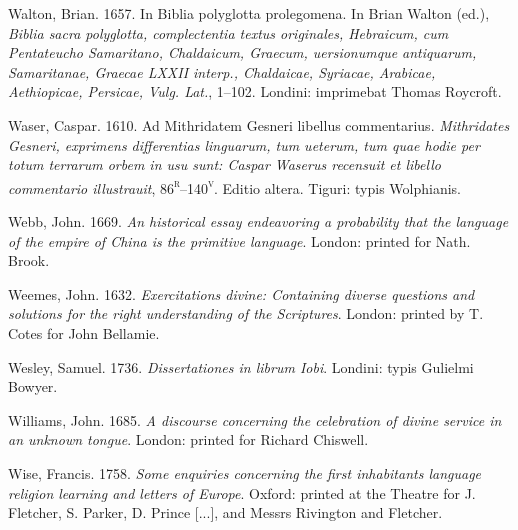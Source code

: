 \begin{styleStandard}
Walton, Brian. 1657. In Biblia polyglotta prolegomena. In Brian Walton (ed.), \textit{Biblia sacra polyglotta, complectentia textus originales, Hebraicum, cum Pentateucho Samaritano, Chaldaicum, Graecum, uersionumque antiquarum, Samaritanae, Graecae LXXII interp., Chaldaicae, Syriacae, Arabicae, Aethiopicae, Persicae, Vulg. Lat.}, 1–102. Londini: imprimebat Thomas Roycroft.
\end{styleStandard}

\begin{styleStandard}
Waser, Caspar. 1610. Ad Mithridatem Gesneri libellus commentarius. \textit{Mithridates Gesneri, exprimens differentias linguarum, tum ueterum, tum quae hodie per totum terrarum orbem in usu sunt: Caspar Waserus recensuit et libello commentario illustrauit}, 86\textsc{\textsuperscript{r}}–140\textsc{\textsuperscript{v}}. Editio altera. Tiguri: typis Wolphianis.
\end{styleStandard}

\begin{styleStandard}
Webb, John. 1669. \textit{An historical essay endeavoring a probability that the language of the empire of China is the primitive language}. London: printed for Nath. Brook.
\end{styleStandard}

\begin{styleStandard}
Weemes, John. 1632. \textit{Exercitations divine: Containing diverse questions and solutions for the right understanding of the Scriptures}. London: printed by T. Cotes for John Bellamie.
\end{styleStandard}

\begin{styleStandard}
Wesley, Samuel. 1736. \textit{Dissertationes in librum Iobi}. Londini: typis Gulielmi Bowyer.
\end{styleStandard}

\begin{styleStandard}
Williams, John. 1685. \textit{A discourse concerning the celebration of divine service in an unknown tongue}. London: printed for Richard Chiswell.
\end{styleStandard}

\begin{styleStandard}
Wise, Francis. 1758. \textit{Some enquiries concerning the first inhabitants language religion learning and letters of Europe}. Oxford: printed at the Theatre for J. Fletcher, S. Parker, D. Prince [...], and Messrs Rivington and Fletcher.
\end{styleStandard}

